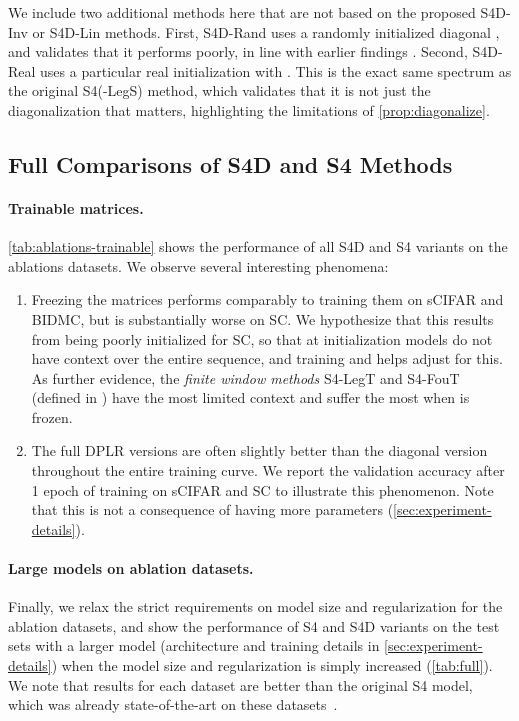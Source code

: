 \documentclass{article}
\newcommand{\para}[1]{\paragraph{#1}}
\begin{document}
We include two additional methods here that are not based on the proposed S4D-Inv or S4D-Lin methods.
First, S4D-Rand uses a randomly initialized diagonal , and validates that it performs poorly, in line with earlier findings \citep{gu2022efficiently,gupta2022diagonal}.
Second, S4D-Real uses a particular real initialization with .
This is the exact same spectrum as the original S4(-LegS) method,
which validates that it is not just the diagonalization that matters,
highlighting the limitations of \cref{prop:diagonalize}.




\subsection{Full Comparisons of S4D and S4 Methods}
\label{sec:experiments:full}


\para{Trainable  matrices.}

\cref{tab:ablations-trainable} shows the performance of all S4D and S4 variants \citep{gu2022hippo} on the ablations datasets.
We observe several interesting phenomena:
\begin{enumerate}[label=(\roman*)]
  \item Freezing the matrices performs comparably to training them on sCIFAR and BIDMC, but is substantially worse on SC. We hypothesize that this results from  being poorly initialized for \textsc{SC}, so that at initialization models do not have context over the entire sequence, and training  and  helps adjust for this.
    As further evidence, the \emph{finite window methods} S4-LegT and S4-FouT (defined in \citep{gu2022hippo}) have the most limited context and suffer the most when  is frozen.
  \item The full DPLR versions are often slightly better than the diagonal version throughout the entire training curve. We report the validation accuracy after 1 epoch of training on sCIFAR and SC to illustrate this phenomenon. Note that this is not a consequence of having more parameters (\cref{sec:experiment-details}).
\end{enumerate}

\para{Large models on ablation datasets.}

Finally, we relax the strict requirements on model size and regularization for the ablation datasets,
and show the performance of S4 and S4D variants on the test sets with a larger model (architecture and training details in \cref{sec:experiment-details}) when the model size and regularization is simply increased (\cref{tab:full}).
We note that results for each dataset are better than the original S4 model, which was already state-of-the-art on these datasets~\citep{gu2021lssl,gu2022efficiently}.
\end{document}
